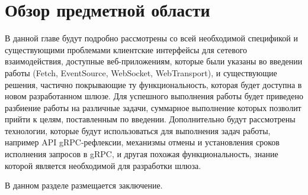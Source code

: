 \documentclass[times]{itmo-student-thesis}
\begin{document}
\chapter{Обзор предметной области}

В данной главе будут подробно рассмотрены со всей необходимой спецификой и существующими проблемами клиентские интерфейсы для сетевого взаимодействия, доступные веб-приложениям, которые были указаны во введении работы (Fetch, EventSource, WebSocket, WebTransport),
и существующие решения, частично покрывающие ту функциональность, которая будет доступна в новом разработанном шлюзе. Для успешного выполнения работы будет приведено разбиение работы на различные задачи, суммарное выполнение которых позволит прийти к целям, поставленным по введении.
Дополнительно будут рассмотрены технологии, которые будут использоваться для выполнения задач работы, например API gRPC-рефлексии, механизмы отмены и установления сроков исполнения запросов в gRPC, и другая похожая функциональность, знание которой является необходимой для разработки шлюза.

\startconclusionpage

В данном разделе размещается заключение.

\printmainbibliography

\appendix
\end{document}
